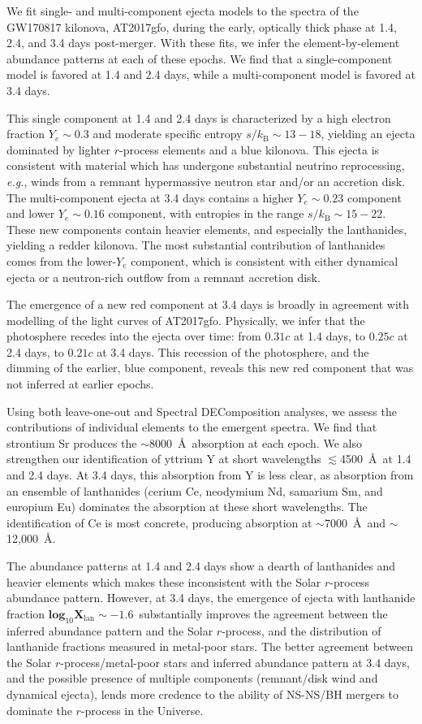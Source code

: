\documentclass[twocolumn,twocolappendix]{aastex63}
\def\eg{{\it e.g.}}
\begin{document}
{{We fit single- and multi-component ejecta models to the spectra of the GW170817 kilonova, AT2017gfo, during the early, optically thick phase at 1.4, 2.4, and 3.4 days post-merger. With these fits, we infer the element-by-element abundance patterns at each of these epochs. We find that a single-component model is favored at 1.4 and 2.4 days, while a multi-component model is favored at 3.4 days. 

This single component at 1.4 and 2.4 days is characterized by a high electron fraction $Y_e \sim 0.3$ and moderate specific entropy $s / k_{\mathrm{B}} \sim 13 - 18$, yielding an ejecta dominated by lighter $r$-process elements and a blue kilonova. This ejecta is consistent with material which has undergone substantial neutrino reprocessing, \eg, winds from a remnant hypermassive neutron star and/or an accretion disk. The multi-component ejecta at 3.4 days contains a higher $Y_e \sim 0.23$ component and lower $Y_e \sim 0.16$ component, with entropies in the range $s / k_{\mathrm{B}}\sim 15 - 22$. These new components contain heavier elements, and especially the lanthanides, yielding a redder kilonova. The most substantial contribution of lanthanides comes from the lower-$Y_e$ component, which is consistent with either dynamical ejecta or a neutron-rich outflow from a remnant accretion disk. 

The emergence of a new red component at 3.4 days is broadly in agreement with modelling of the light curves of AT2017gfo. Physically, we infer that the photosphere recedes into the ejecta over time: from $0.31c$ at 1.4 days, to $0.25c$ at 2.4 days, to $0.21c$ at 3.4 days. This recession of the photosphere, and the dimming of the earlier, blue component, reveals this new red component that was not inferred at earlier epochs. 

Using both leave-one-out and Spectral DEComposition analyses, we assess the contributions of individual elements to the emergent spectra. We find that strontium Sr produces the $\sim$8000~\AA~absorption at each epoch. We also strengthen our identification of yttrium Y at short wavelengths $\lesssim$4500~\AA~at 1.4 and 2.4 days. At 3.4 days, this absorption from Y is less clear, as absorption from an ensemble of lanthanides (cerium Ce, neodymium Nd, samarium Sm, and europium Eu) dominates the absorption at these short wavelengths. The identification of Ce is most concrete, producing absorption at $\sim$7000~\AA~and $\sim$12,000~\AA.

The abundance patterns at 1.4 and 2.4 days show a dearth of lanthanides and heavier elements which makes these inconsistent with the Solar $r$-process abundance pattern. However, at 3.4 days, the emergence of ejecta with lanthanide fraction $\mathbf{log_{\mathrm{10}} X_{\mathrm{lan}} \sim -1.6}$~substantially improves the agreement between the inferred abundance pattern and the Solar $r$-process, and the distribution of lanthanide fractions measured in metal-poor stars. The better agreement between the Solar $r$-process/metal-poor stars and inferred abundance pattern at 3.4 days, and the possible presence of multiple components (remnant/disk wind and dynamical ejecta), lends more credence to the ability of NS-NS/BH mergers to dominate the $r$-process in the Universe. 

}}
\end{document}
